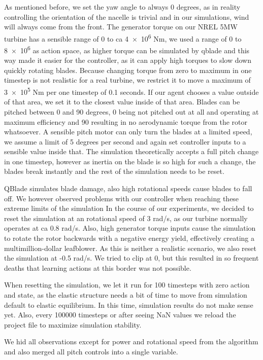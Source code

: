 \documentclass[hyperref,beleg]{cgvpub}
\begin{document}
As mentioned before, we set the yaw angle to always 0 degrees, as in reality controlling the orientation of the nacelle is trivial and in our simulations, wind will always come from the front. The generator torque on our NREL 5MW turbine has a sensible range of \num{0} to ca \num{4e6} Nm, we used a range of \num{0} to \num{8e6} as action space, as higher torque can be simulated by qblade and this way made it easier for the controller, as it can apply high torques to slow down quickly rotating blades.
Because changing torque from zero to maximum in one timestep is not realistic for a real turbine, we restrict it to move a maximum of \num{3e5} Nm per one timestep of 0.1 seconds. If our agent chooses a value outside of that area, we set it to the closest value inside of that area.
Blades can be pitched between 0 and 90 degrees, 0 being not pitched out at all and operating at maximum efficiency and 90 resulting in no aerodynamic torque from the rotor whatsoever. A sensible pitch motor can only turn the blades at a limited speed, we assume a limit of 5 degrees per second and again set controller inputs to a sensible value inside that. The simulation theoretically accepts a full pitch change in one timestep, however as inertia on the blade is so high for such a change, the blades break instantly and the rest of the simulation needs to be reset.

QBlade simulates blade damage, also high rotational speeds cause blades to fall off. We however observed problems with our controller when reaching these extreme limits of the simulation In the course of our experiments, we decided to reset the simulation at an rotational speed of 3 rad/s, as our turbine normally operates at ca 0.8 rad/s. Also, high generator torque inputs cause the simulation to rotate the rotor backwards with a negative energy yield, effectively creating a multimillion-dollar leafblower. As this is neither a realistic scenario, we also reset the simulation at -0.5 rad/s. We tried to clip at 0, but this resulted in so frequent deaths that learning actions at this border was not possible.

When resetting the simulation, we let it run for 100 timesteps with zero action and state, as the elastic structure needs a bit of time to move from simulation default to elastic equilibrium. In this time, simulation results do not make sense yet. Also, every 100000 timesteps or after seeing NaN values we reload the project file to maximize simulation stability.

We hid all observations except for power and rotational speed from the algorithm and also merged all pitch controls into a single variable.
\end{document}
